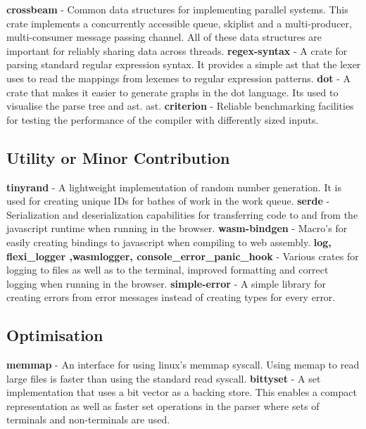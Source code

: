 \textbf{crossbeam} - Common data structures for implementing parallel systems.
This crate implements a concurrently accessible queue, skiplist and a
multi-producer, multi-consumer message passing channel. All of these data
structures are important for reliably sharing data across threads.
\newline\newline
\textbf{regex-syntax} - A crate for parsing standard regular expression syntax.
It provides a simple \gls{ast} that the lexer uses to read the mappings from
lexemes to regular expression patterns.
\newline\newline
\textbf{dot} - A crate that makes it easier to generate graphs in the dot
language. Its used to visualise the parse tree and \gls{ast}.
\gls{ast}.
\newline\newline
\textbf{criterion} - Reliable benchmarking facilities for testing the performance of the
compiler with differently sized inputs.

\subsection{Utility or Minor Contribution}
\textbf{tinyrand} - A lightweight implementation of random number
generation. It is used for creating unique IDs for bathes of work in the work
queue.
\textbf{serde} - Serialization and deserialization capabilities for transferring
code to and from the javascript runtime when running in the browser.
\newline\newline
\textbf{wasm-bindgen} - Macro's for easily creating bindings to javascript when
compiling to web assembly.
\newline\newline
\textbf{log, flexi\_logger ,wasm\-logger, console\_error\_panic\_hook} - Various
crates for logging to files as well as to the terminal, improved formatting and
correct logging when running in the browser.
\newline\newline
\textbf{simple-error} - A simple library for creating errors from error messages
instead of creating types for every error.

\subsection{Optimisation}
\textbf{memmap} - An interface for using linux's memmap syscall. Using memap to
read large files is  faster than using the standard read syscall.
\newline\newline
\textbf{bittyset} - A set implementation that uses a bit vector as a backing
store. This enables a compact representation as well as faster set operations in
the parser where sets of terminals and non-terminals are used.


